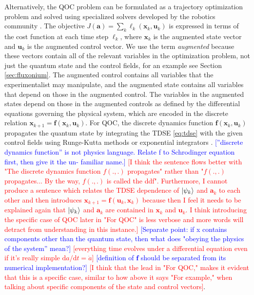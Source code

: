 Alternatively, the QOC problem can be formulated as a trajectory optimization problem 
and solved using specialized solvers developed by the robotics community
\cite{Schulman13, Tedrake16, Hereid2017FROST, howell2019altro}.
The objective $J(\mathbf{a})=\sum_k \ell_{k}(\mathbf{x}_{k}, \mathbf{u}_{k})$
is expressed in terms of the
cost function at each time step $\ell_k$, where
$\mathbf{x}_{k}$ is the augmented state vector
and $\mathbf{u}_{k}$ is the augmented control vector.
We use the term \emph{augmented} because these
vectors contain all of the relevant variables in the optimization problem,
not just the quantum state and the control fields,
for an example see Section \ref{sec:fluxonium}.
The augmented control contains all variables that the experimentalist
may manipulate, and the augmented state contains all variables that depend
on those in the augmented control.
The variables in the augmented states depend on those in the augmented
controls as defined by the differential equations governing the physical system, which are
encoded in the discrete relation
$\mathbf{x}_{k + 1} = \mathbf{f}(\mathbf{x}_{k}, \mathbf{u}_{k})$.
For QOC, the discrete dynamics function $\mathbf{f}(\mathbf{x}_{k}, \mathbf{u}_{k})$
propagates the quantum state by
integrating the TDSE \eqref{eq:tdse} with the given control fields
using Runge-Kutta methods \cite{jorgensen2011numerical}
or exponential integrators \cite{auer2018magnus, berland2006solving, einkemmer2017performance,
  shillito2020fast}.
\textcolor{blue}{[”discrete dynamics function” is not physics language.
    Relate f to Schrodinger equation first, then give it the un- familiar name.]}
\textcolor{red}{[I think the sentence flows better with "The discrete dynamics function
    $f(., .)$ propagates" rather than "$f(., .)$ propagates... By the way, $f(., .)$ is
    called the ddf". Furthermore, I cannot produce a sentence which relates
    the TDSE dependence of $\ket{\psi_{k}}$ and $\mathbf{a}_{k}$ to each other
    and then introduces $\mathbf{x}_{k + 1} = \mathbf{f}(\mathbf{u}_{k}, \mathbf{x}_{k})$
    because then I feel it needs to be explained again that $\ket{\psi_{k}}$
    and $\mathbf{a}_{k}$ are contained in $\mathbf{x}_{k}$ and $\mathbf{u}_{k}$.
    I think introducing the specific case of QOC later in "For QOC"
    is less verbose and more words will detract from understanding in this instance.]}
\textcolor{blue}{[Separate point: if x contains components other than the quantum state,
    then what does "obeying the physics of the system” mean?]}
\textcolor{red}{[everything time evolves under a differential equation even if it's
    really simple $\mathrm{d}a/\mathrm{d}t = \dot{a}$]}
\textcolor{blue}{[definition of $\mathbf{f}$ should be separated from its numerical
    implementation?]}
\textcolor{red}{[I think that the lead in "For QOC," makes it evident that this is
    a specific case,
    similar to how above it says "For example," when talking about specific components
    of the state and control vectors]}.


